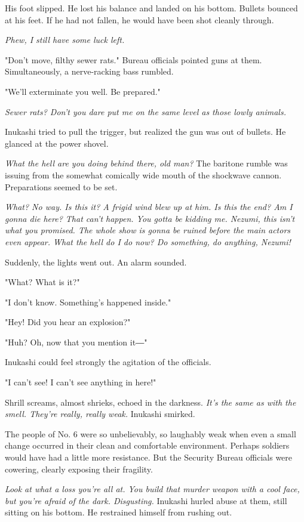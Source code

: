 His foot slipped. He lost his balance and landed on his bottom. Bullets
bounced at his feet. If he had not fallen, he would have been shot
cleanly through.

\emph{Phew, I still have some luck left.}

"Don't move, filthy sewer rats." Bureau officials pointed guns at them.
Simultaneously, a nerve-racking bass rumbled.

"We'll exterminate you well. Be prepared."

\emph{Sewer rats? Don't you dare put me on the same level as those lowly
	animals.}

Inukashi tried to pull the trigger, but realized the gun was out of
bullets. He glanced at the power shovel.

\emph{What the hell are you doing behind there, old man?} The baritone rumble
was issuing from the somewhat comically wide mouth of the shockwave
cannon. Preparations seemed to be set.

\emph{What? No way. Is this it? A frigid wind blew up at him. Is this the end?
	Am I gonna die here? That can't happen. You gotta be kidding me. Nezumi,
	this isn't what you promised. The whole show is gonna be ruined before
	the main actors even appear. What the hell do I do now? Do something, do
	anything, Nezumi!}

Suddenly, the lights went out. An alarm sounded.

"What? What is it?"

"I don't know. Something's happened inside."

"Hey! Did you hear an explosion?"

"Huh? Oh, now that you mention it―"

Inukashi could feel strongly the agitation of the officials.

"I can't see! I can't see anything in here!"

Shrill screams, almost shrieks, echoed in the darkness. \emph{It's the same as
	with the smell. They're really, really weak.} Inukashi smirked.

The people of No. 6 were so unbelievably, so laughably weak when even a
small change occurred in their clean and comfortable environment.
Perhaps soldiers would have had a little more resistance. But the
Security Bureau officials were cowering, clearly exposing their
fragility.

\emph{Look at what a loss you're all at. You build that murder weapon with a
	cool face, but you're afraid of the dark. Disgusting.} Inukashi hurled
abuse at them, still sitting on his bottom. He restrained himself from
rushing out.

